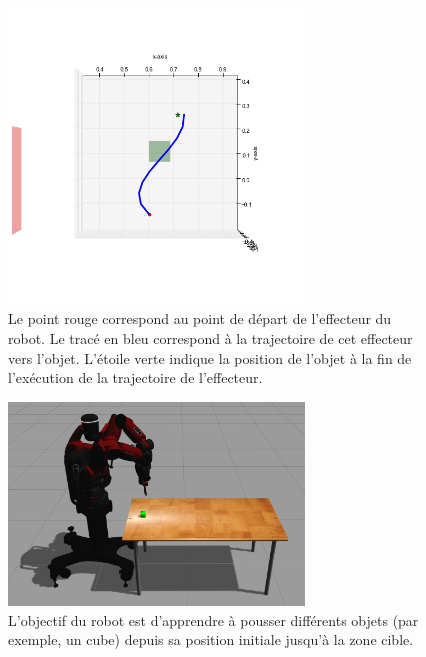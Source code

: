 \documentclass{llncs}
\begin{document}
\begin{figure}[ht]
  \begin{center}
  \includegraphics[width=0.7\textwidth]{figures/ns_trajectory.png}
  \caption{Le point rouge correspond au point de départ de l'effecteur du robot. Le tracé en bleu correspond à la trajectoire de cet effecteur vers l'objet. L'étoile verte indique la position de l'objet à la fin de l'exécution de la trajectoire de l'effecteur.}
  \label{fig:ns_traj}
  \end{center}
\end{figure}

\begin{figure}[ht]
  \begin{center}
  \includegraphics[width=0.7\textwidth]{figures/Experiment_setup.png}
  \caption{L'objectif du robot est d'apprendre à pousser différents objets (par exemple, un cube) depuis sa position initiale jusqu'à la zone cible.}
  \label{fig7}
  \end{center}
\end{figure}
\end{document}
